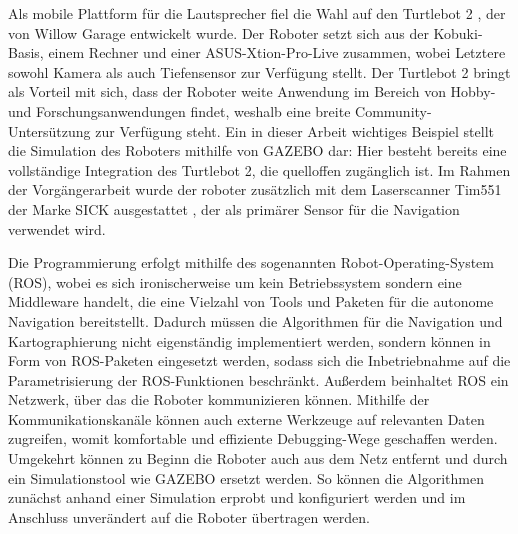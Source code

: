 Als mobile Plattform für die Lautsprecher fiel die Wahl auf den Turtlebot 2 \cite{Turtlebot}, der von Willow Garage entwickelt wurde. Der Roboter setzt sich aus der Kobuki-Basis, einem Rechner und einer ASUS-Xtion-Pro-Live zusammen, wobei Letztere sowohl Kamera als auch Tiefensensor zur Verfügung stellt. Der Turtlebot 2 bringt als Vorteil mit sich, dass der Roboter weite Anwendung im Bereich von Hobby- und Forschungsanwendungen findet, weshalb eine breite Community-Untersützung zur Verfügung steht. Ein in dieser Arbeit wichtiges Beispiel stellt die Simulation des Roboters mithilfe von GAZEBO \cite{gazebo} dar: Hier besteht bereits eine vollständige Integration des Turtlebot 2, die quelloffen zugänglich ist. Im Rahmen der Vorgängerarbeit wurde der roboter zusätzlich mit dem Laserscanner Tim551 der Marke SICK ausgestattet \cite{SICK}, der als primärer Sensor für die Navigation verwendet wird.

Die Programmierung erfolgt mithilfe des sogenannten Robot-Operating-System (ROS), wobei es sich ironischerweise um kein Betriebssystem sondern eine Middleware handelt, die eine Vielzahl von Tools und Paketen für die autonome Navigation bereitstellt. Dadurch müssen die Algorithmen für die Navigation und Kartographierung nicht eigenständig implementiert werden, sondern können in Form von ROS-Paketen eingesetzt werden, sodass sich die Inbetriebnahme auf die Parametrisierung der ROS-Funktionen beschränkt. Außerdem beinhaltet ROS ein Netzwerk, über das die Roboter kommunizieren können. Mithilfe der Kommunikationskanäle können auch externe Werkzeuge auf relevanten Daten zugreifen, womit komfortable und effiziente Debugging-Wege geschaffen werden. Umgekehrt können zu Beginn die Roboter auch aus dem Netz entfernt und durch ein Simulationstool wie GAZEBO ersetzt werden. So können die Algorithmen zunächst anhand einer Simulation erprobt und konfiguriert werden und im Anschluss unverändert auf die Roboter übertragen werden.

